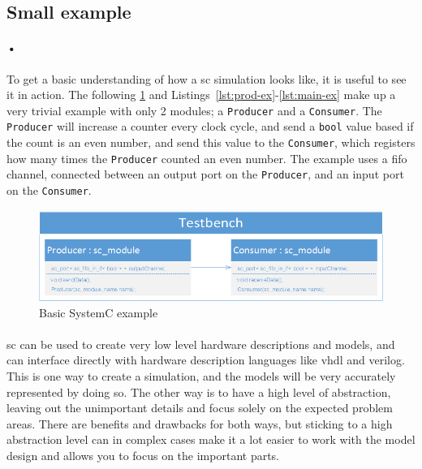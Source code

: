 \documentclass[a4paper, 12pt]{report}
\newcommand{\codeword}[1]{\texttt{#1}}
\begin{document}
\newpage
\subsection{Small example}

\paragraph{•}
To get a basic understanding of how a \gls{sc} simulation looks like, it is useful to see it in action.
The following \ref{fig:sc-ex} and Listings~\ref{lst:prod-ex}-\ref{lst:main-ex} make up a very trivial example with only 2 modules; a \codeword{Producer} and a \codeword{Consumer}.
The \codeword{Producer} will increase a counter every clock cycle, and send a \codeword{bool} value based if the count is an even number, and send this value to the \codeword{Consumer}, which registers how many times the \codeword{Producer} counted an even number.
The example uses a \gls{fifo} channel, connected between an output port on the \codeword{Producer}, and an input port on the \codeword{Consumer}.

\begin{figure}[h!]
  \centering
    \includegraphics[width=1.0\textwidth]{images/sc-example.png}
     \caption{Basic SystemC example}
    \label{fig:sc-ex}
\end{figure}

\noindent
\begin{minipage}{\linewidth}

\end{minipage}
\begin{minipage}{\linewidth}

\end{minipage}
\begin{minipage}{\linewidth}

\end{minipage}

\paragraph{}
\gls{sc} can be used to create very low level hardware descriptions and models, and can interface directly with hardware description languages like \gls{vhdl} and \gls{verilog}.
This is one way to create a simulation, and the models will be very accurately represented by doing so.
The other way is to have a high level of abstraction, leaving out the unimportant details and focus solely on the expected problem areas.
There are benefits and drawbacks for both ways, but sticking to a high abstraction level can in complex cases make it a lot easier to work with the model design and allows you to focus on the important parts.
\end{document}
